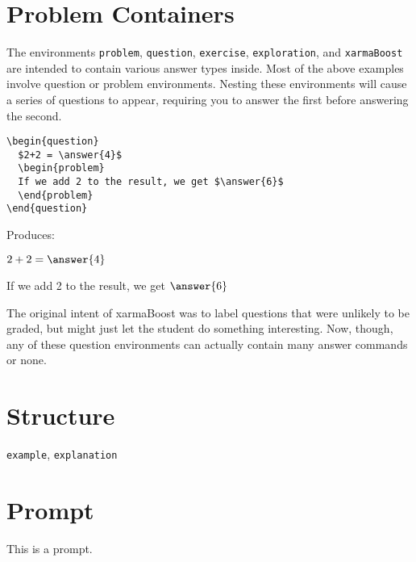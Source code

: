 \documentclass{ximera}
\begin{document}
\section{Problem Containers}

The environments \verb!problem!, \verb!question!, \verb!exercise!, \verb!exploration!, and \verb!xarmaBoost! are intended to contain various answer types inside. Most of the above examples involve question or problem environments. Nesting these environments will cause a series of questions to appear, requiring you to answer the first before answering the second.

\begin{verbatim}
\begin{question}
  $2+2 = \answer{4}$
  \begin{problem}
  If we add 2 to the result, we get $\answer{6}$
  \end{problem}
\end{question}
\end{verbatim}

Produces:

\begin{question}
  $2+2 = \answer{4}$
  \begin{problem}
  If we add 2 to the result, we get $\answer{6}$
  \end{problem}
\end{question}

\begin{remark} 
The original intent of xarmaBoost was to label questions that were unlikely to be graded, but might just let the student do something interesting. Now, though, any of these question environments can actually contain many answer commands or none.
\end{remark}

\section{Structure}


\verb!example!, \verb!explanation!



\section{Prompt}

\begin{prompt}
This is a prompt.
\end{prompt}
\end{document}
